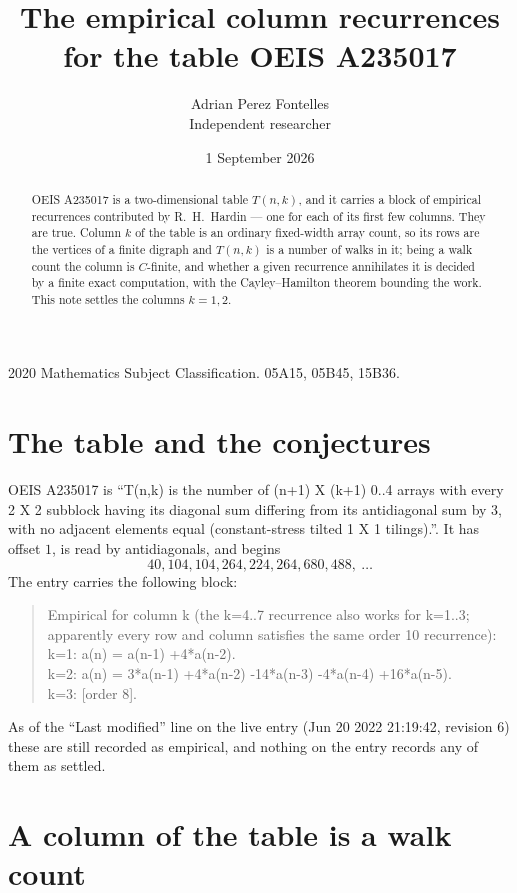 \documentclass[11pt,a4paper]{article}
\title{The empirical column recurrences for the table OEIS A235017}
\author{Adrian Perez Fontelles\\ \small Independent researcher}
\date{1 September 2026}
\theoremstyle{plain}
\theoremstyle{definition}
\begin{document}
\maketitle

\begin{abstract}
OEIS A235017 is a two-dimensional table $T(n,k)$, and it carries a block of empirical
recurrences contributed by R.~H.~Hardin --- one for each of its first few columns. They are
true. Column $k$ of the table is an ordinary fixed-width array count, so its rows are the
vertices of a finite digraph and $T(n,k)$ is a number of walks in it; being a walk count the
column is $C$-finite, and whether a given recurrence annihilates it is decided by a finite
exact computation, with the Cayley--Hamilton theorem bounding the work. This note settles the columns $k=1, 2$.
\end{abstract}

\noindent\small 2020 Mathematics Subject Classification. 05A15, 05B45, 15B36.\normalsize

\section{The table and the conjectures}

OEIS A235017 is ``T(n,k) is the number of (n+1) X (k+1) 0..4 arrays with every 2 X 2 subblock having its diagonal sum differing from its antidiagonal sum by 3, with no adjacent elements equal (constant-stress tilted 1 X 1 tilings).''. It has offset $1$, is
read by antidiagonals, and begins
\[
40, 104, 104, 264, 224, 264, 680, 488,\ \dots
\]
The entry carries the following block:
\begin{quote}\small
Empirical for column k (the k=4..7 recurrence also works for k=1..3; apparently every row and column satisfies the same order 10 recurrence):\\
k=1: a(n) = a(n-1) +4*a(n-2).\\
k=2: a(n) = 3*a(n-1) +4*a(n-2) -14*a(n-3) -4*a(n-4) +16*a(n-5).\\
k=3: [order 8].\\
\end{quote}
As of the ``Last modified'' line on the live entry (Jun 20 2022 21:19:42, revision 6) these are still
recorded as empirical, and nothing on the entry records any of them as settled.

\section{A column of the table is a walk count}
\end{document}
